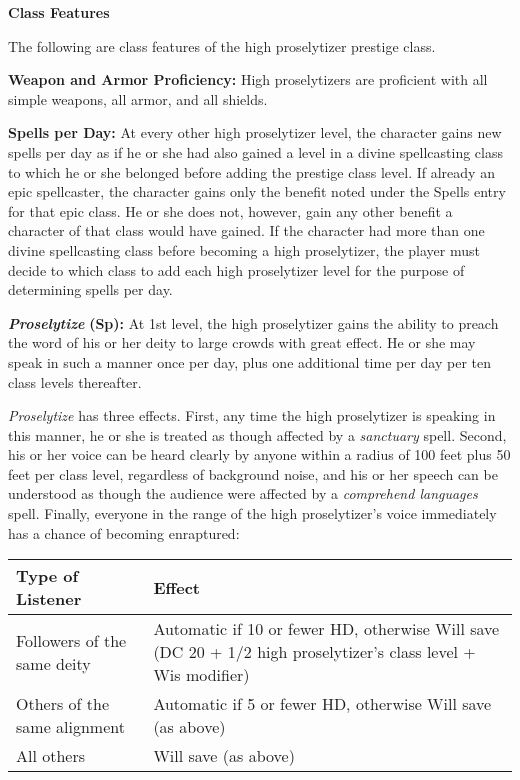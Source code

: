 \documentclass{article}
\begin{document}
\vspace{12pt}
\textbf{Class Features}

The following are class features of the high proselytizer prestige class. 

\textbf{Weapon and Armor Proficiency:} High proselytizers are proficient with all 
simple weapons, all armor, and all shields. 

\textbf{Spells per Day:} At every other high proselytizer level, the character 
gains new spells per day as if he or she had also gained a level in a divine spellcasting 
class to which he or she belonged before adding the prestige class level. If already 
an epic spellcaster, the character gains only the benefit noted under the Spells 
entry for that epic class. He or she does not, however, gain any other benefit 
a character of that class would have gained. If the character had more than one 
divine spellcasting class before becoming a high proselytizer, the player must 
decide to which class to add each high proselytizer level for the purpose of determining 
spells per day. 

\textit{\textbf{Proselytize }}\textbf{(Sp):} At 1st level, the high proselytizer 
gains the ability to preach the word of his or her deity to large crowds with great 
effect. He or she may speak in such a manner once per day, plus one additional 
time per day per ten class levels thereafter. 

\textit{Proselytize }has three effects. First, any time the high proselytizer is 
speaking in this manner, he or she is treated as though affected by a \textit{sanctuary 
}spell. Second, his or her voice can be heard clearly by anyone within a radius 
of 100 feet plus 50 feet per class level, regardless of background noise, and his 
or her speech can be understood as though the audience were affected by a \textit{comprehend 
languages }spell. Finally, everyone in the range of the high proselytizer's voice 
immediately has a chance of becoming enraptured: 

\begin{tabular}{|>{\raggedright}p{108pt}|>{\raggedright}p{218pt}|}
\hline
T\textbf{ype of Listener} & E\textbf{ffect}\tabularnewline
\hline
Followers of the same deity & Automatic if 10 or fewer HD, otherwise Will save 
(DC 20 + 1/2 high proselytizer's class level + Wis modifier) \tabularnewline
\hline
Others of the same alignment & Automatic if 5 or fewer HD, otherwise Will save 
(as above) \tabularnewline
\hline
All others & Will save (as above) \tabularnewline
\hline
\end{tabular}
\end{document}
